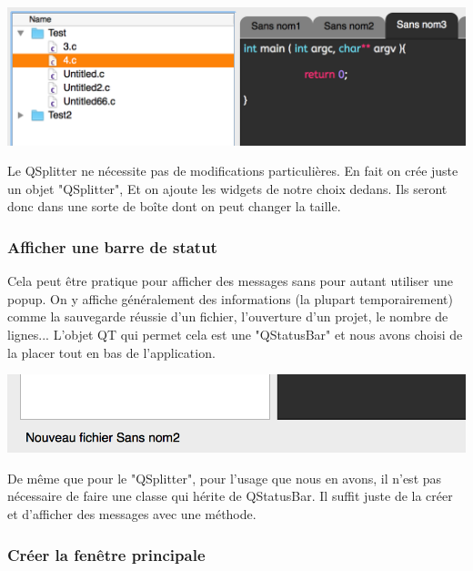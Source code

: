 \documentclass[a4paper,12pt]{article}
\begin{document}
			\begin{center}
				\includegraphics[scale=0.6]{images/QSplitter_2}
				\vspace{0.6cm}
			\end{center}
			Le QSplitter ne nécessite pas de modifications particulières. En fait on crée juste un objet "QSplitter", Et on ajoute les widgets de notre choix dedans. Ils seront donc dans une sorte de boîte dont on peut changer la taille.\\
			
			\subsubsection*{Afficher une barre de statut}
			
			 	Cela peut être pratique pour afficher des messages sans pour autant utiliser une popup. On y affiche généralement des informations (la plupart temporairement) comme la sauvegarde réussie d'un fichier, l'ouverture d'un projet, le nombre de lignes... L'objet QT qui permet cela est une "QStatusBar" et nous avons choisi de la placer tout en bas de l'application.\\
			\begin{center}
				\includegraphics[scale=0.6]{images/QStatusBar}
				\vspace{0.6cm}
			\end{center}
			De même que pour le "QSplitter", pour l'usage que nous en avons, il n'est pas nécessaire de faire une classe qui hérite de QStatusBar. Il suffit juste de la créer et d'afficher des messages avec une méthode.\\
			
			\subsubsection*{Créer la fenêtre principale}
			
\end{document}

